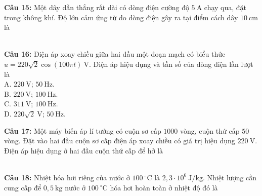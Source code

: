 \documentclass[12pt,a4paper]{article}
\begin{document}
\begin{minipage}{\textwidth}
\noindent \textbf{Câu 15:} Một dây dẫn thẳng rất dài có dòng điện cường độ $5\ \text{A}$ chạy qua, đặt trong không khí. Độ lớn cảm ứng từ do dòng điện gây ra tại điểm cách dây $10\ \text{cm}$ là\\
\noindent{}\\
\noindent{}
\end{minipage}


\begin{minipage}{\textwidth}
\noindent \textbf{Câu 16:} Điện áp xoay chiều giữa hai đầu một đoạn mạch có biểu thức $u = 220\sqrt{2}\cos(100\pi t)\ \text{V}$. Điện áp hiệu dụng và tần số của dòng điện lần lượt là\\
\noindent A. $220\ \text{V}$; $50\ \text{Hz}$.\\
\noindent B. $220\ \text{V}$; $100\ \text{Hz}$.\\
\noindent C. $311\ \text{V}$; $100\ \text{Hz}$.\\
\noindent D. $220\sqrt{2}\ \text{V}$; $50\ \text{Hz}$.
\end{minipage}


\begin{minipage}{\textwidth}
\noindent \textbf{Câu 17:} Một máy biến áp lí tưởng có cuộn sơ cấp $1000$ vòng, cuộn thứ cấp $50$ vòng. Đặt vào hai đầu cuộn sơ cấp điện áp xoay chiều có giá trị hiệu dụng $220\ \text{V}$. Điện áp hiệu dụng ở hai đầu cuộn thứ cấp để hở là\\
\noindent{}\\
\noindent{}
\end{minipage}


\begin{minipage}{\textwidth}
\noindent \textbf{Câu 18:} Nhiệt hóa hơi riêng của nước ở $100\ ^{\circ}\text{C}$ là $2{,}3 \cdot 10^{6}\ \text{J/kg}$. Nhiệt lượng cần cung cấp để $0{,}5\ \text{kg}$ nước ở $100\ ^{\circ}\text{C}$ hóa hơi hoàn toàn ở nhiệt độ đó là\\
\noindent{}\\
\noindent{}
\end{minipage}
\end{document}
